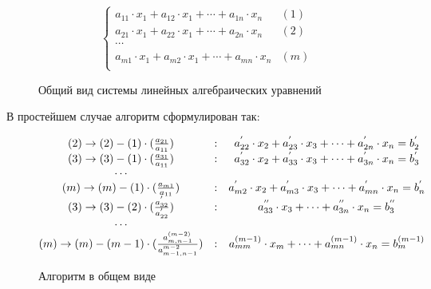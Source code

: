 \documentclass[12pt,a4paper]{scrartcl}
\begin{document}
\begin{figure}[h]
	\centering
	\[
	\left\{
	\begin{array}{lc}
		a_{11}\cdot x_{1} + a_{12}\cdot x_{1} + \cdots + a_{1n}\cdot x_{n} & (1)\\
		a_{21}\cdot x_{1} + a_{22}\cdot x_{1} + \cdots + a_{2n}\cdot x_{n} & (2)\\
		\cdots \\
		a_{m1}\cdot x_{1} + a_{m2}\cdot x_{1} + \cdots + a_{mn}\cdot x_{n} & (m)\\
	\end{array} 
	\right.
	\]	
	\caption{Общий вид системы линейных алгебраических уравнений}\label{eq:genericlinearsys}
\end{figure}

В простейшем случае алгоритм сформулирован так:

\begin{figure}[h]
	\centering
	\[
	\begin{array}{@{}clc@{}}
		(2) \rightarrow (2) - (1) \cdot (\frac{a_{21}}{a_{11}}) &:& 
		a^{'}_{22} \cdot x_{2} + a^{'}_{23} \cdot x_{3} + \cdots + a^{'}_{2n} \cdot x_{n} = b^{'}_2\\
		
		(3) \rightarrow (3) - (1) \cdot (\frac{a_{31}}{a_{11}}) &:& 
		a^{'}_{32} \cdot x_{2} + a^{'}_{33} \cdot x_{3} + \cdots + a^{'}_{3n} \cdot x_{n} = b^{'}_3\\
		
		\cdots\\
	
		(m) \rightarrow (m) - (1) \cdot (\frac{a_{m1}}{a_{11}}) &:& 
		a^{'}_{m2} \cdot x_{2} + a^{'}_{m3} \cdot x_{3} + \cdots + a^{'}_{mn} \cdot x_{n} = b^{'}_n\\
		
		(3) \rightarrow (3) - (2) \cdot (\frac{a^{'}_{32}}{a^{'}_{22}}) &:& 
		a^{''}_{33} \cdot x_{3} + \cdots + a^{''}_{3n} \cdot x_{n} = b^{''}_3\\
		
		\cdots\\
		
		(m) \rightarrow (m) - (m - 1) \cdot (\frac{a^{(m - 2)}_{m,n - 1}}{a^{m - 2}_{m - 1, n - 	1}}) &:& 
		a^{(m - 1)}_{mm} \cdot x_{m} + \cdots + a^{(m - 1)}_{mn} \cdot x_{n} = b^{(m - 1)}_m\\
	\end{array}
	\]
	\caption{Алгоритм в общем виде}\label{eq:genericlinearsysalg}
\end{figure}
\end{document}
